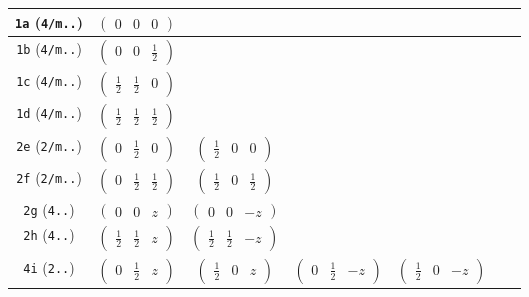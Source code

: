 \documentclass[fleqn,9pt,landscape]{jsarticle}
\begin{document}
\begin{center}
\begin{longtable}{ccccccc}
{\tt 1a} ({\tt 4/m..}) & $ \begin{pmatrix} 0 & 0 & 0 \end{pmatrix} $ & $  $ & $  $ & $  $ & $  $ & $  $ \\ \hline
{\tt 1b} ({\tt 4/m..}) & $ \begin{pmatrix} 0 & 0 & \frac{1}{2} \end{pmatrix} $ & $  $ & $  $ & $  $ & $  $ & $  $ \\ \hline
{\tt 1c} ({\tt 4/m..}) & $ \begin{pmatrix} \frac{1}{2} & \frac{1}{2} & 0 \end{pmatrix} $ & $  $ & $  $ & $  $ & $  $ & $  $ \\ \hline
{\tt 1d} ({\tt 4/m..}) & $ \begin{pmatrix} \frac{1}{2} & \frac{1}{2} & \frac{1}{2} \end{pmatrix} $ & $  $ & $  $ & $  $ & $  $ & $  $ \\ \hline
{\tt 2e} ({\tt 2/m..}) & $ \begin{pmatrix} 0 & \frac{1}{2} & 0 \end{pmatrix} $ & $ \begin{pmatrix} \frac{1}{2} & 0 & 0 \end{pmatrix} $ & $  $ & $  $ & $  $ & $  $ \\ \hline
{\tt 2f} ({\tt 2/m..}) & $ \begin{pmatrix} 0 & \frac{1}{2} & \frac{1}{2} \end{pmatrix} $ & $ \begin{pmatrix} \frac{1}{2} & 0 & \frac{1}{2} \end{pmatrix} $ & $  $ & $  $ & $  $ & $  $ \\ \hline
{\tt 2g} ({\tt 4..}) & $ \begin{pmatrix} 0 & 0 & z \end{pmatrix} $ & $ \begin{pmatrix} 0 & 0 & - z \end{pmatrix} $ & $  $ & $  $ & $  $ & $  $ \\ \hline
{\tt 2h} ({\tt 4..}) & $ \begin{pmatrix} \frac{1}{2} & \frac{1}{2} & z \end{pmatrix} $ & $ \begin{pmatrix} \frac{1}{2} & \frac{1}{2} & - z \end{pmatrix} $ & $  $ & $  $ & $  $ & $  $ \\ \hline
{\tt 4i} ({\tt 2..}) & $ \begin{pmatrix} 0 & \frac{1}{2} & z \end{pmatrix} $ & $ \begin{pmatrix} \frac{1}{2} & 0 & z \end{pmatrix} $ & $ \begin{pmatrix} 0 & \frac{1}{2} & - z \end{pmatrix} $ & $ \begin{pmatrix} \frac{1}{2} & 0 & - z \end{pmatrix} $ & $  $ & $  $ \\ \hline

\end{longtable}
\end{center}
\end{document}
